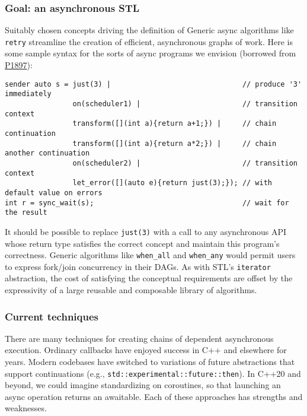 \documentclass[a4paper,12pt,notitlepage,twoside,openright]{article}
\begin{document}
\hypertarget{goal-an-asynchronous-stl}{%
\subsubsection{Goal: an asynchronous
STL}\label{goal-an-asynchronous-stl}}

Suitably chosen concepts driving the definition of Generic async
algorithms like \texttt{retry} streamline the creation of
efficient, asynchronous graphs of work. Here is some sample syntax for
the sorts of async programs we envision (borrowed from
\href{http://wg21.link/P1897}{P1897}):

\begin{verbatim}
sender auto s = just(3) |                               // produce '3' immediately
                on(scheduler1) |                        // transition context
                transform([](int a){return a+1;}) |     // chain continuation
                transform([](int a){return a*2;}) |     // chain another continuation
                on(scheduler2) |                        // transition context
                let_error([](auto e){return just(3);}); // with default value on errors
int r = sync_wait(s);                                   // wait for the result
\end{verbatim}

It should be possible to replace \texttt{just(3)} with a
call to any asynchronous API whose return type satisfies the correct
concept and maintain this program's correctness. Generic algorithms like
\texttt{when_all} and \texttt{when_any} would
permit users to express fork/join concurrency in their DAGs. As with
STL's \texttt{iterator} abstraction, the cost of satisfying
the conceptual requirements are offset by the expressivity of a large
reusable and composable library of algorithms.

\hypertarget{current-techniques}{%
\subsubsection{Current techniques}\label{current-techniques}}

There are many techniques for creating chains of dependent asynchronous
execution. Ordinary callbacks have enjoyed success in C++ and elsewhere
for years. Modern codebases have switched to variations of future
abstractions that support continuations (e.g.,
\texttt{std::experimental::future::then}). In C++20 and
beyond, we could imagine standardizing on coroutines, so that launching
an async operation returns an awaitable. Each of these approaches has
strengths and weaknesses.
\end{document}
